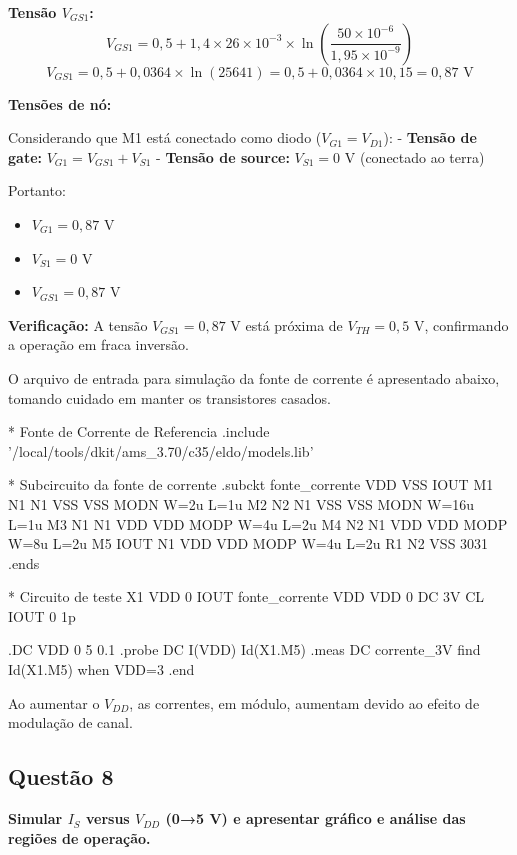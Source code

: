 \documentclass[12pt,a4paper]{article}
\begin{document}
\t\textbf{Tensão $V_{GS1}$:}
$$V_{GS1} = 0,5 + 1,4 \times 26 \times 10^{-3} \times \ln\left(\frac{50 \times 10^{-6}}{1,95 \times 10^{-9}}\right)$$
$$V_{GS1} = 0,5 + 0,0364 \times \ln(25641) = 0,5 + 0,0364 \times 10,15 = 0,87 \text{ V}$$

\t\textbf{Tensões de nó:}

Considerando que M1 está conectado como diodo ($V_{G1} = V_{D1}$):
- \t\textbf{Tensão de gate:} $V_{G1} = V_{GS1} + V_{S1}$
- \t\textbf{Tensão de source:} $V_{S1} = 0$ V (conectado ao terra)

Portanto:
\begin{itemize}
    \item $V_{G1} = 0,87$ V
    \item $V_{S1} = 0$ V
    \item $V_{GS1} = 0,87$ V
\end{itemize}

\t\textbf{Verificação:} A tensão $V_{GS1} = 0,87$ V está próxima de $V_{TH} = 0,5$ V, confirmando a operação em fraca inversão.

O arquivo de entrada para simulação da fonte de corrente é apresentado abaixo, tomando cuidado em manter os transistores casados.

\begin{codeblock}[title={Arquivo de simulação da fonte de corrente}]
* Fonte de Corrente de Referencia
.include '/local/tools/dkit/ams_3.70/c35/eldo/models.lib'

* Subcircuito da fonte de corrente
.subckt fonte_corrente VDD VSS IOUT
M1 N1 N1 VSS VSS MODN W=2u L=1u
M2 N2 N1 VSS VSS MODN W=16u L=1u
M3 N1 N1 VDD VDD MODP W=4u L=2u
M4 N2 N1 VDD VDD MODP W=8u L=2u
M5 IOUT N1 VDD VDD MODP W=4u L=2u
R1 N2 VSS 3031
.ends

* Circuito de teste
X1 VDD 0 IOUT fonte_corrente
VDD VDD 0 DC 3V
CL IOUT 0 1p

.DC VDD 0 5 0.1
.probe DC I(VDD) Id(X1.M5)
.meas DC corrente_3V find Id(X1.M5) when VDD=3
.end
\end{codeblock}

Ao aumentar o $V_{DD}$, as correntes, em módulo, aumentam devido ao efeito de modulação de canal.

\subsection*{Questão 8}
	\textbf{Simular $I_S$ versus $V_{DD}$ (0→5 V) e apresentar gráfico e análise das regiões de operação.}
\end{document}
